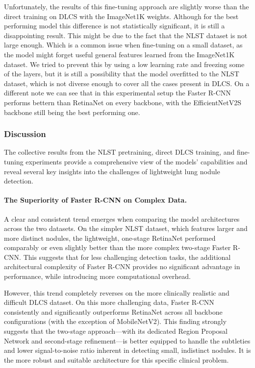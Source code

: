 

Unfortunately, the results of this fine-tuning approach are slightly worse than the direct training on DLCS with the ImageNet1K weights. Although for the best performing model this difference is not statistically significant, it is still a disappointing result.
This might be due to the fact that the NLST dataset is not large enough. Which is a common issue when fine-tuning on a small dataset, as the model might forget useful general features learned from the ImageNet1K dataset.
We tried to prevent this by using a low learning rate and freezing some of the layers, but it is still a possibility that the model overfitted to the NLST dataset, which is not diverse enough to cover all the cases present in DLCS.
On a different note we can see that in this experimental setup the Faster R-CNN performs bettern than RetinaNet on every backbone, with the EfficientNetV2S backbone still being the best performing one.

\subsubsection{Discussion}

The collective results from the NLST pretraining, direct DLCS training, and fine-tuning experiments provide a comprehensive view of the models' capabilities and reveal several key insights into the challenges of lightweight lung nodule detection.

\paragraph{The Superiority of Faster R-CNN on Complex Data.}
A clear and consistent trend emerges when comparing the model architectures across the two datasets. On the simpler NLST dataset, which features larger and more distinct nodules, the lightweight, one-stage RetinaNet performed comparably or even slightly better than the more complex two-stage Faster R-CNN. This suggests that for less challenging detection tasks, the additional architectural complexity of Faster R-CNN provides no significant advantage in performance, while introducing more computational overhead.

However, this trend completely reverses on the more clinically realistic and difficult DLCS dataset. On this more challenging data, Faster R-CNN consistently and significantly outperforms RetinaNet across all backbone configurations (with the exception of MobileNetV2). This finding strongly suggests that the two-stage approach—with its dedicated Region Proposal Network and second-stage refinement—is better equipped to handle the subtleties and lower signal-to-noise ratio inherent in detecting small, indistinct nodules. It is the more robust and suitable architecture for this specific clinical problem.

